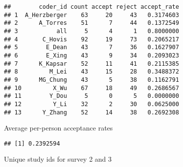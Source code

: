 \documentclass[
]{article}
\newenvironment{Shaded}{\begin{snugshade}}{\end{snugshade}}
\newcommand{\CommentTok}[1]{\textcolor[rgb]{0.56,0.35,0.01}{\textit{#1}}}
\newcommand{\DataTypeTok}[1]{\textcolor[rgb]{0.13,0.29,0.53}{#1}}
\newcommand{\KeywordTok}[1]{\textcolor[rgb]{0.13,0.29,0.53}{\textbf{#1}}}
\newcommand{\NormalTok}[1]{#1}
\newcommand{\OperatorTok}[1]{\textcolor[rgb]{0.81,0.36,0.00}{\textbf{#1}}}
\newcommand{\StringTok}[1]{\textcolor[rgb]{0.31,0.60,0.02}{#1}}
\begin{document}
\begin{verbatim}
##        coder_id count accept reject accept_rate
## 1  A_Herzberger    63     20     43   0.3174603
## 2      A_Torres    51      7     44   0.1372549
## 3           all     5      4      1   0.8000000
## 4       C_Hovis    92     19     73   0.2065217
## 5        E_Dean    43      7     36   0.1627907
## 6        E_Xing    43      9     34   0.2093023
## 7      K_Kapsar    52     11     41   0.2115385
## 8         M_Lei    43     15     28   0.3488372
## 9      MG_Chung    43      5     38   0.1162791
## 10         X_Wu    67     18     49   0.2686567
## 11        Y_Dou     5      0      5   0.0000000
## 12         Y_Li    32      2     30   0.0625000
## 13      Y_Zhang    52     14     38   0.2692308
\end{verbatim}

Average per-person acceptance rates

\begin{Shaded}
\end{Shaded}

\begin{verbatim}
## [1] 0.2392594
\end{verbatim}

Unique study ids for survey 2 and 3

\begin{Shaded}
\end{Shaded}
\end{document}
